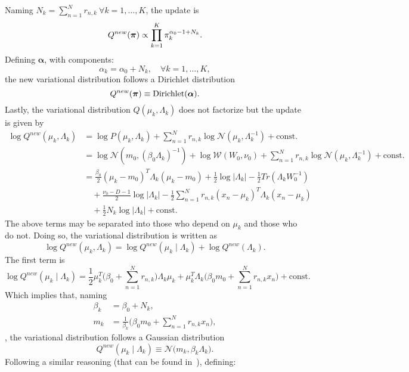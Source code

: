 Naming \(N_{k} = \sum_{n=1}^{N}r_{n,k} \ \forall k=1,\dots,K\), the update is
\[
  Q^{new}(\bm{\pi}) \propto \prod_{k=1}^{K}\pi_{k}^{\alpha_{0}-1+N_{k}}.
\]
Defining \(\bm{\alpha}\), with components:
\[
  \alpha_{k} = \alpha_{0} + N_{k}, \quad \forall k = 1,\dots,K,
\]
the new variational distribution follows a Dirichlet distribution
\[
  Q^{new}(\bm{\pi}) \equiv \text{Dirichlet}(\bm{\alpha}).
\]
Lastly, the variational distribution \(Q(\mu_{k}, \Lambda_{k})\) does not factorize but the update is given by
\[
  \begin{aligned}
    \log Q^{new}(\mu_{k}, \Lambda_{k}) &= \log P(\mu_{k}, \Lambda_{k}) + \sum_{n=1}^{N}r_{n,k} \log \mathcal{N}(\mu_{k}, \Lambda_{k}^{-1}) + \text{const.}\\
    &= \log \mathcal{N}(m_{0}, {(\beta_{0}\Lambda_{k})}^{-1}) + \log \mathcal{W}(W_{0}, \nu_{0}) + \sum_{n=1}^{N}r_{n,k} \log \mathcal{N}(\mu_{k}, \Lambda_{k}^{-1}) + \text{const.}\\
    &= \frac{\beta_{0}}{2}{(\mu_{k} - m_{0})}^{T}\Lambda_{k}(\mu_{k} - m_{0}) + \frac{1}{2}\log |\Lambda_{k}| - \frac{1}{2}Tr(\Lambda_{k}W_{0}^{-1})\\
    &\quad + \frac{\nu_{0} - D - 1}{2}\log |\Lambda_{k}| - \frac{1}{2}\sum_{n=1}^{N}r_{n,k}{(x_{n}- \mu_{k})}^{T}\Lambda_{k}(x_{n} - \mu_{k})\\
    &\quad + \frac{1}{2}N_{k} \log |\Lambda_{k}| + \text{const.}
    \end{aligned}
  \]
  The above terms may be separated into those who depend on \(\mu_{k}\) and those who do not. Doing so, the variational distribution is written as
  \[
  \log Q^{new}(\mu_{k}, \Lambda_{k}) = \log Q^{new}(\mu_{k} \mid \Lambda_{k}) + \log Q^{new}(\Lambda_{k}).
  \]
  The first term is
  \[
      \log Q^{new}(\mu_{k}  \mid \Lambda_{k}) = \frac{1}{2}\mu_{k}^{T}\Big( \beta_{0} + \sum_{n=1}^{N}r_{n,k} \Big)\Lambda_{k}\mu_{k} + \mu_{k}^{T}\Lambda_{k}\Big( \beta_{0}m_{0} + \sum_{n=1}^{N}r_{n,k}x_{n} \Big) + \text{const.}
  \]
  Which implies that, naming
  \[
    \begin{aligned}
      \beta_{k} &= \beta_{0} + N_{k},\\
      m_{k} &= \frac{1}{\beta_{k}}\Big(\beta_{0}m_{0} + \sum_{n=1}^{N}r_{n,k}x_{n}\Big),
    \end{aligned}
  \]
  , the variational distribution follows a Gaussian distribution
  \[
    Q^{new}(\mu_{k} \mid \Lambda_{k}) \equiv \mathcal{N}\Big( m_{k}, \beta_{k}\Lambda_{k}\Big).
  \]
  Following a similar reasoning (that can be found in~\cite{Svensn2007PatternRA}), defining:
